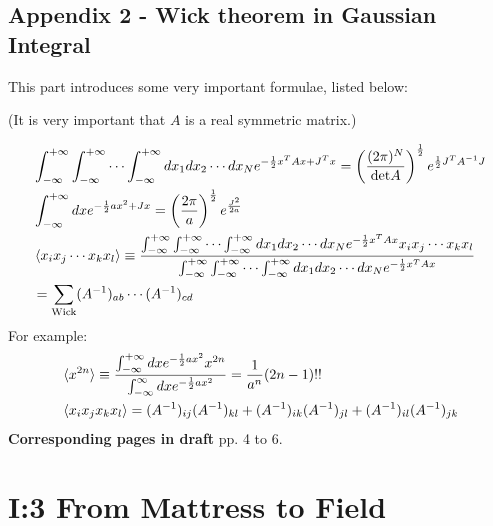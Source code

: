\documentclass{book}
\numberwithin{equation}{subsection} %
\theoremstyle{definition}
\begin{document}
    \subsection{Appendix 2 - Wick theorem in Gaussian 
    Integral}

    This part introduces some very important formulae, listed 
    below:

    (It is very important that $A$ is a real symmetric matrix.)
    
    \begin{align}
        &\int_{-\infty}^{+\infty} \int_{-\infty}^{+\infty} \cdots
        \int_{-\infty}^{+\infty} dx_1 dx_2 \cdots dx_N
            e^{-\frac{1}{2} x^T A x + J^T x} =
            \left( \frac{(2\pi)^N}{\text{det}A} \right)^{\frac{1}{2}}
            e^{\frac{1}{2}J^T A^{-1}J}
   		\label{eq:QFT_in_a_Nutshell_Part_I.2.appdx1.1}
		\\
        &\int_{-\infty}^{+\infty} dx
        e^{-\frac{1}{2}ax^2+Jx} =
        \left(\frac{2\pi}{a}\right)^{\frac{1}{2}}
        e^{\frac{J^2}{2a}} 
        \\
        &\braket{x_i x_j \cdots x_k x_l}
        \equiv
            \frac{
                \int_{-\infty}^{+\infty}\int_{-\infty}^{+\infty}\cdots
                \int_{-\infty}^{+\infty} dx_1 dx_2\cdots dx_N
                e^{-\frac{1}{2}x^T Ax} x_i x_j \cdots x_k x_l}
                {
                \int_{-\infty}^{+\infty}\int_{-\infty}^{+\infty}\cdots
                \int_{-\infty}^{+\infty} dx_1 dx_2\cdots dx_N
                e^{-\frac{1}{2}x^T Ax} }
            \nonumber \\
        &= \sum_{\text{Wick}} 
            (A^{-1})_{ab}\cdots(A^{-1})_{cd}
    \end{align}
    For example:
    \begin{align*}
        &\braket{x^{2n}} \equiv 
            \frac{\int_{-\infty}^{+\infty}dx
            e^{-\frac{1}{2}ax^2} x^{2n}}
            {\int_{-\infty}^{\infty} dx e^{-\frac{1}{2}ax^2}
            }
        = \frac{1}{a^n}(2n-1)!! \\
        &\braket{x_ix_jx_kx_l} = 
        (A^{-1})_{ij}(A^{-1})_{kl}+(A^{-1})_{ik}(A^{-1})_{jl}
        +(A^{-1})_{il}(A^{-1})_{jk}
    \end{align*}
    \textbf{Corresponding pages in draft} pp. 4 to 6.
    
\section{I:3 From Mattress to Field}
\label{sec:QFT_in_a_Nutshell_Part_I.3}
\end{document}
